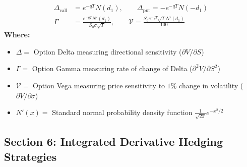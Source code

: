 \begin{formulabox}
\begin{align*}
\Delta_{\text{call}} &= e^{-q T} N(d_1), \qquad \Delta_{\text{put}} = -e^{-q T} N(-d_1) \\
\Gamma &= \frac{e^{-q T} N'(d_1)}{S_0 \sigma \sqrt{T}}, \qquad \mathcal{V} = \frac{S_0 e^{-q T} \sqrt{T} N'(d_1)}{100}
\end{align*}
\textbf{Where:}
\begin{itemize}[leftmargin=1.8em, noitemsep]
    \item $\Delta =$ Option Delta measuring directional sensitivity ($\partial V / \partial S$)
    \item $\Gamma =$ Option Gamma measuring rate of change of Delta ($\partial^2 V / \partial S^2$)
    \item $\mathcal{V} =$ Option Vega measuring price sensitivity to $1\%$ change in volatility ($\partial V / \partial \sigma$)
    \item $N'(x) =$ Standard normal probability density function $\frac{1}{\sqrt{2\pi}} e^{-x^2/2}$
\end{itemize}
\end{formulabox}

\subsection*{Section 6: Integrated Derivative Hedging Strategies}

